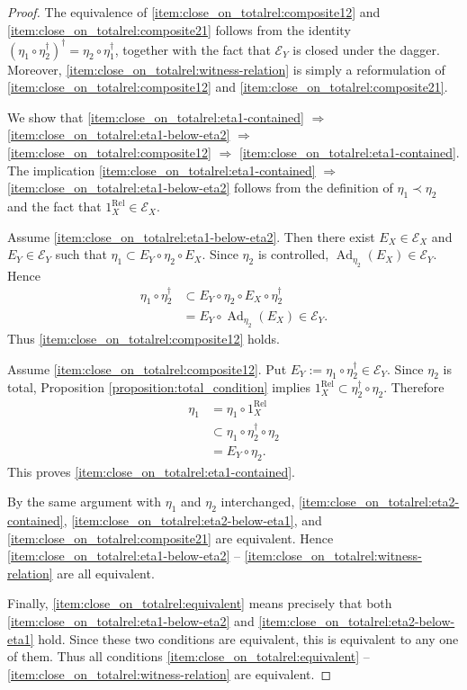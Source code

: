 \documentclass[12pt, a4paper]{amsart}
\theoremstyle{definition}
\newcommand{\Ad}{\mathop{\mathrm{Ad}}\nolimits}
\newcommand{\Rel}{\mathrm{Rel}}
\begin{document}
\begin{proof}
The equivalence of
\eqref{item:close_on_totalrel:composite12}
and
\eqref{item:close_on_totalrel:composite21}
follows from the identity
$(\eta_1\circ\eta_2^\dagger)^\dagger
=
\eta_2\circ\eta_1^\dagger$, 
together with the fact that $\mathcal{E}_Y$ is closed under the dagger.
Moreover,
\eqref{item:close_on_totalrel:witness-relation}
is simply a reformulation of
\eqref{item:close_on_totalrel:composite12}
and
\eqref{item:close_on_totalrel:composite21}.

We show that
\eqref{item:close_on_totalrel:eta1-contained}
$\Rightarrow$
\eqref{item:close_on_totalrel:eta1-below-eta2}
$\Rightarrow$
\eqref{item:close_on_totalrel:composite12}
$\Rightarrow$
\eqref{item:close_on_totalrel:eta1-contained}.
The implication
\eqref{item:close_on_totalrel:eta1-contained}
$\Rightarrow$
\eqref{item:close_on_totalrel:eta1-below-eta2}
follows from the definition of $\eta_1\prec\eta_2$ and the fact that
$1_X^{\Rel}\in\mathcal{E}_X$.

Assume
\eqref{item:close_on_totalrel:eta1-below-eta2}.
Then there exist $E_X\in\mathcal{E}_X$ and $E_Y\in\mathcal{E}_Y$ such that
$\eta_1\subset E_Y\circ\eta_2\circ E_X$.
Since $\eta_2$ is controlled, $\Ad_{\eta_2}(E_X)\in\mathcal{E}_Y$.
Hence
\begin{align*}
\eta_1\circ\eta_2^\dagger
&\subset
E_Y\circ\eta_2\circ E_X\circ\eta_2^\dagger \\
&=
E_Y\circ\Ad_{\eta_2}(E_X)
\in\mathcal{E}_Y.
\end{align*}
Thus
\eqref{item:close_on_totalrel:composite12}
holds.

Assume
\eqref{item:close_on_totalrel:composite12}.
Put $E_Y:=\eta_1\circ\eta_2^\dagger\in\mathcal{E}_Y$.
Since $\eta_2$ is total, Proposition \ref{proposition:total_condition}
implies $1_X^{\Rel}\subset\eta_2^\dagger\circ\eta_2$.
Therefore
\begin{align*}
\eta_1
&=
\eta_1\circ1_X^{\Rel} \\
&\subset
\eta_1\circ\eta_2^\dagger\circ\eta_2 \\
&=
E_Y\circ\eta_2.
\end{align*}
This proves
\eqref{item:close_on_totalrel:eta1-contained}.

By the same argument with $\eta_1$ and $\eta_2$ interchanged,
\eqref{item:close_on_totalrel:eta2-contained},
\eqref{item:close_on_totalrel:eta2-below-eta1},
and
\eqref{item:close_on_totalrel:composite21}
are equivalent.
Hence
\eqref{item:close_on_totalrel:eta1-below-eta2}
--
\eqref{item:close_on_totalrel:witness-relation}
are all equivalent.

Finally,
\eqref{item:close_on_totalrel:equivalent}
means precisely that both
\eqref{item:close_on_totalrel:eta1-below-eta2}
and
\eqref{item:close_on_totalrel:eta2-below-eta1}
hold.
Since these two conditions are equivalent, this is equivalent to any one of
them.
Thus all conditions
\eqref{item:close_on_totalrel:equivalent}
--
\eqref{item:close_on_totalrel:witness-relation}
are equivalent.
\end{proof}
\end{document}
